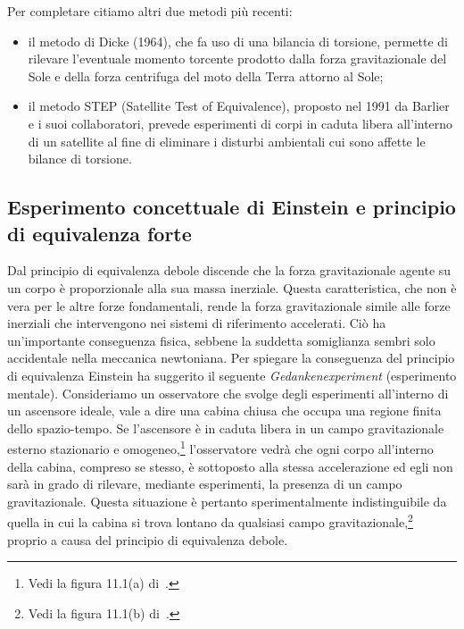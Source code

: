 Per completare citiamo altri due metodi più recenti:
\begin{itemize}
\item il metodo di Dicke (1964), che fa uso di una bilancia di torsione,
  permette di rilevare l'eventuale momento torcente prodotto dalla forza
  gravitazionale del Sole e della forza centrifuga del moto della Terra attorno
  al Sole;
\item il metodo STEP (Satellite Test of Equivalence), proposto nel 1991 da
  Barlier e i suoi collaboratori, prevede esperimenti di corpi in caduta libera
  all'interno di un satellite al fine di eliminare i disturbi ambientali cui
  sono affette le bilance di torsione.
\end{itemize}

\subsection[Principio di equivalenza forte]{Esperimento concettuale di Einstein
  e principio di equivalenza forte}
\label{sec:esperim-concet-einstein}

Dal principio di equivalenza debole discende che la forza gravitazionale agente
su un corpo è proporzionale alla sua massa inerziale.  Questa caratteristica,
che non è vera per le altre forze fondamentali, rende la forza gravitazionale
simile alle forze inerziali che intervengono nei sistemi di riferimento
accelerati.  Ciò ha un'importante conseguenza fisica, sebbene la suddetta
somiglianza sembri solo accidentale nella meccanica newtoniana.  Per spiegare la
conseguenza del principio di equivalenza Einstein ha suggerito il seguente
\emph{Gedankenexperiment} (esperimento mentale).  Consideriamo un osservatore
che svolge degli esperimenti all'interno di un ascensore ideale, vale a dire una
cabina chiusa che occupa una regione finita dello spazio-tempo.  Se l'ascensore
è in caduta libera in un campo gravitazionale esterno stazionario e
omogeneo,\footnote{Vedi la figura 11.1(a) di~\textcite[466]{barone:relativita}.}
l'osservatore vedrà che ogni corpo all'interno della cabina, compreso se stesso,
è sottoposto alla stessa accelerazione ed egli non sarà in grado di rilevare,
mediante esperimenti, la presenza di un campo gravitazionale.  Questa situazione
è pertanto sperimentalmente indistinguibile da quella in cui la cabina si trova
lontano da qualsiasi campo gravitazionale,\footnote{Vedi la figura 11.1(b)
  di~\textcite[466]{barone:relativita}.}  proprio a causa del principio di
equivalenza debole.

